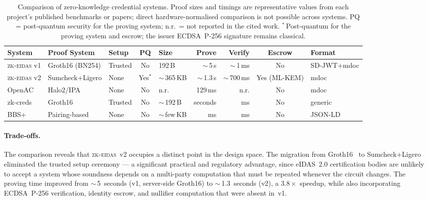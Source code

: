 \begin{table}[t]
  \centering
  \caption{Comparison of zero-knowledge credential systems.
           Proof sizes and timings are representative values from each project's published benchmarks or papers; direct hardware-normalised comparison is not possible across systems.
           PQ = post-quantum security for the proving system; n.r.\ = not reported in the cited work.
           ${}^{*}$\,Post-quantum for the proving system and escrow; the issuer ECDSA~P-256 signature remains classical.}\label{tab:comparison}
  \small
  \setlength{\tabcolsep}{4pt}
  \begin{tabular}{lllclrrcl}
    \toprule
    System & Proof System & Setup & PQ & Size & Prove & Verify & Escrow & Format \\
    \midrule
    \textsc{zk-eidas} v1
      & Groth16 (BN254)
      & Trusted
      & No
      & 192\,B
      & ${\sim}\,$5\,s
      & ${\sim}\,$1\,ms
      & No
      & SD-JWT+mdoc \\
    \textsc{zk-eidas} v2
      & Sumcheck+Ligero
      & None
      & Yes$^{*}$
      & ${\sim}\,$365\,KB
      & ${\sim}\,$1.3\,s
      & ${\sim}\,$700\,ms
      & Yes (ML-KEM)
      & mdoc \\
    OpenAC~\cite{openac}
      & Halo2/IPA
      & None
      & No
      & n.r.
      & 129\,ms
      & n.r.
      & No
      & mdoc \\
    zk-creds~\cite{zkcreds}
      & Groth16
      & Trusted
      & No
      & ${\sim}\,$192\,B
      & seconds
      & ms
      & No
      & generic \\
    BBS+~\cite{bbs}
      & Pairing-based
      & None
      & No
      & ${\sim}\,$few\,KB
      & ms
      & ms
      & No
      & JSON-LD \\
    \bottomrule
  \end{tabular}
\end{table}

\paragraph{Trade-offs.}
The comparison reveals that \textsc{zk-eidas}~v2 occupies a distinct point in the design space.
The migration from Groth16~\cite{groth16} to Sumcheck+Ligero eliminated the trusted setup ceremony --- a significant practical and regulatory advantage, since eIDAS~2.0 certification bodies are unlikely to accept a system whose soundness depends on a multi-party computation that must be repeated whenever the circuit changes.
The proving time improved from ${\sim}\,$5~seconds (v1, server-side Groth16) to ${\sim}\,$1.3~seconds (v2), a $3.8\times$ speedup, while also incorporating ECDSA~P-256 verification, identity escrow, and nullifier computation that were absent in~v1.

